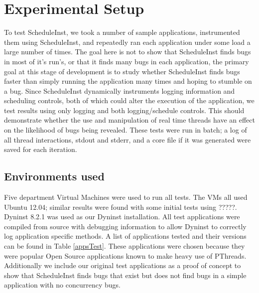 \documentclass[10pt,]{article} %
\begin{document}
\section{Experimental Setup}

To test ScheduleInst, we took a number of sample applications, instrumented them using ScheduleInst, and repeatedly ran each application under some load a large number of times.  The goal here is not to show that ScheduleInst finds bugs in most of it’s run’s, or that it finds many bugs in each application, the primary goal at this stage of development is to study whether ScheduleInst finds bugs faster than simply running the application many times and hoping to stumble on a bug.  Since ScheduleInst dynamically instruments logging information and scheduling controls, both of which could alter the execution of the application, we test results using only logging and both logging/schedule controls.  This should demonstrate whether the use and manipulation of real time threads have an effect on the likelihood of bugs being revealed.  These tests were run in batch; a log of all thread interactions, stdout and stderr, and a core file if it was generated were saved for each iteration.       



\subsection{Environments used}

Five department Virtual Machines were used to run all tests.  The VMs all used Ubuntu 12.04; similar results were found with some initial tests using ?????.  Dyninst 8.2.1 was used as our Dyninst installation.  All test applications were compiled from source with debugging information to allow Dyninst to correctly log application specific methods. A list of applications tested and their versions can be found in Table \ref{appsTest}.  These applications were chosen because they were popular Open Source applications known to make heavy use of PThreads.  Additionally we include our original test applications as a proof of concept to show that ScheduleInst finds bugs that exist but does not find bugs in a simple application with no concurrency bugs.  
\end{document}
